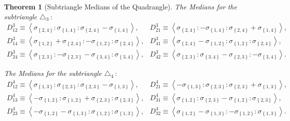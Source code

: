 \documentclass{unswthesis}
\newtheorem{theorem}{Theorem}
\begin{document}
\begin{theorem}[Subtriangle Medians of the Quadrangle]
The Medians for the subtriangle $\triangle _{3}\,:$%
\begin{equation*}
\begin{array}{cc}
D_{12}^{3}\equiv \left\langle \sigma _{\left\{ 2,4\right\} }:\sigma
_{\left\{ 1,4\right\} }:\sigma _{\left\{ 2,4\right\} }-\sigma _{\left\{
1,4\right\} }\right\rangle , & D_{21}^{3}\equiv \left\langle \sigma
_{\left\{ 2,4\right\} }:-\sigma _{\left\{ 1,4\right\} }:\sigma _{\left\{
2,4\right\} }+\sigma _{\left\{ 1,4\right\} }\right\rangle , \\ 
D_{14}^{3}\equiv \left\langle \sigma _{\left\{ 1,2\right\} }+\sigma
_{\left\{ 2,4\right\} }:-\sigma _{\left\{ 1,2\right\} }:\sigma _{\left\{
2,4\right\} }\right\rangle , & D_{41}^{3}\equiv \left\langle \sigma
_{\left\{ 2,4\right\} }-\sigma _{\left\{ 1,2\right\} }:\sigma _{\left\{
1,2\right\} }:\sigma _{\left\{ 2,4\right\} }\right\rangle , \\ 
D_{24}^{3}\equiv \left\langle \sigma _{\left\{ 2,3\right\} }:-\sigma
_{\left\{ 2,3\right\} }-\sigma _{\left\{ 3,4\right\} }:\sigma _{\left\{
3,4\right\} }\right\rangle , & D_{42}^{3}\equiv \left\langle \sigma
_{\left\{ 2,3\right\} }:\sigma _{\left\{ 3,4\right\} }-\sigma _{\left\{
2,3\right\} }:-\sigma _{\left\{ 3,4\right\} }\right\rangle .%
\end{array}%
\end{equation*}

The Medians for the subtriangle $\triangle _{4}\,:$%
\begin{equation*}
\begin{array}{cc}
D_{12}^{4}\equiv \left\langle \sigma _{\left\{ 1,3\right\} }:\sigma
_{\left\{ 2,3\right\} }:\sigma _{\left\{ 2,3\right\} }-\sigma _{\left\{
1,3\right\} }\right\rangle , & D_{21}^{4}\equiv \left\langle -\sigma
_{\left\{ 1,3\right\} }:\sigma _{\left\{ 2,3\right\} }:\sigma _{\left\{
2,3\right\} }+\sigma _{\left\{ 1,3\right\} }\right\rangle , \\ 
D_{13}^{4}\equiv \left\langle -\sigma _{\left\{ 1,2\right\} }:\sigma
_{\left\{ 1,2\right\} }+\sigma _{\left\{ 2,3\right\} }:\sigma _{\left\{
2,3\right\} }\right\rangle , & D_{31}^{4}\equiv \left\langle \sigma
_{\left\{ 1,2\right\} }:\sigma _{\left\{ 2,3\right\} }-\sigma _{\left\{
1,2\right\} }:\sigma _{\left\{ 2,3\right\} }\right\rangle , \\ 
D_{23}^{4}\equiv \left\langle -\sigma _{\left\{ 1,2\right\} }-\sigma
_{\left\{ 1,3\right\} }:\sigma _{\left\{ 1,2\right\} }:\sigma _{\left\{
1,3\right\} }\right\rangle , & D_{32}^{4}\equiv \left\langle \sigma
_{\left\{ 1,2\right\} }-\sigma _{\left\{ 1,3\right\} }:-\sigma _{\left\{
1,2\right\} }:\sigma _{\left\{ 1,3\right\} }\right\rangle .%
\end{array}%
\end{equation*}
\end{theorem}
\end{document}

